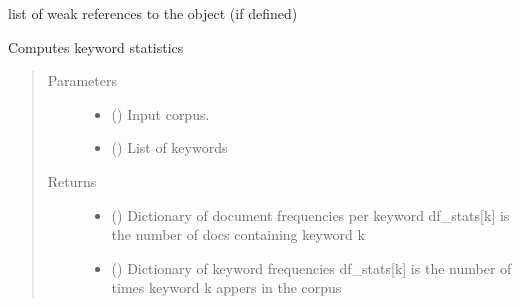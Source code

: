 \documentclass[letterpaper,10pt,english]{sphinxmanual}
\begin{document}
\begin{fulllineitems}
\begin{fulllineitems}
\end{fulllineitems}


\begin{fulllineitems}
\label{\detokenize{dc_preprocessor:src.domain_classifier.preprocessor.CorpusProcessor.__weakref__}}
\sphinxAtStartPar
list of weak references to the object (if defined)

\end{fulllineitems}


\begin{fulllineitems}
\label{\detokenize{dc_preprocessor:src.domain_classifier.preprocessor.CorpusProcessor.compute_keyword_stats}}
\sphinxAtStartPar
Computes keyword statistics
\begin{quote}\begin{description}
\item[{Parameters}] \leavevmode\begin{itemize}
\item {} 
\sphinxAtStartPar
{} () \textendash{} Input corpus.

\item {} 
\sphinxAtStartPar
{} () \textendash{} List of keywords

\end{itemize}

\item[{Returns}] \leavevmode
\sphinxAtStartPar
\begin{itemize}
\item {} 
\sphinxAtStartPar
{} () \textendash{} Dictionary of document frequencies per keyword
df\_stats{[}k{]} is the number of docs containing keyword k

\item {} 
\sphinxAtStartPar
{} () \textendash{} Dictionary of keyword frequencies
df\_stats{[}k{]} is the number of times keyword k appers in the corpus


\end{itemize}
\end{description}
\end{quote}
\end{fulllineitems}
\end{fulllineitems}
\end{document}
